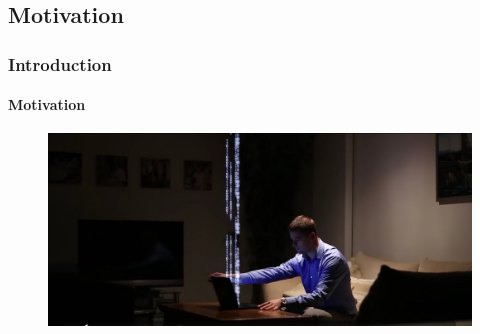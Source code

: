 \documentclass{beamer}
\theoremstyle{remark}
\begin{document}
%
\subsection{Motivation}
\begin{frame}
\frametitle{Introduction}
\framesubtitle{Motivation}
\begin{figure}
\includegraphics[width=\columnwidth]{point_example}
\end{figure}
\end{frame}
\end{document}
